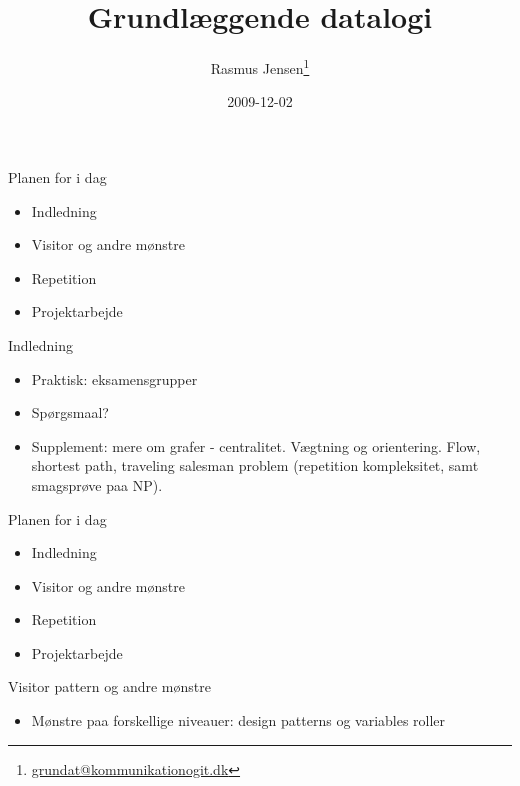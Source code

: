 \documentclass[a4paper,landscape]{slides}
\title{Grundlæggende datalogi}
\author{Rasmus Jensen\footnote{\url{grundat@kommunikationogit.dk}}}
\date{2009-12-02}
\begin{document}
\maketitle

\begin{slide} \begin{center} {\large 
Planen for i dag
} \end{center} \begin{itemize} \addtolength{\itemsep}{-\baselineskip}
   \item Indledning
   \item Visitor og andre mønstre
   \item Repetition
   \item Projektarbejde
\end{itemize} \end{slide} \begin{slide} \begin{center} {\large 
    Indledning
} \end{center} \begin{itemize} \addtolength{\itemsep}{-\baselineskip}
       \item Praktisk: eksamensgrupper
       \item Spørgsmaal?
       \item Supplement: mere om grafer - centralitet. Vægtning og orientering. Flow, shortest path, traveling salesman problem (repetition kompleksitet, samt smagsprøve paa NP).
\end{itemize} \end{slide} \begin{slide} \begin{center} {\large 
Planen for i dag
} \end{center} \begin{itemize} \addtolength{\itemsep}{-\baselineskip}
   \item Indledning
   \item Visitor og andre mønstre
   \item Repetition
   \item Projektarbejde
\end{itemize} \end{slide} \begin{slide} \begin{center} {\large 
        Visitor pattern og andre mønstre
} \end{center} \begin{itemize} \addtolength{\itemsep}{-\baselineskip}
       \item  Mønstre paa forskellige niveauer: design patterns og variables roller

\end{itemize}
\end{slide}
\end{document}
